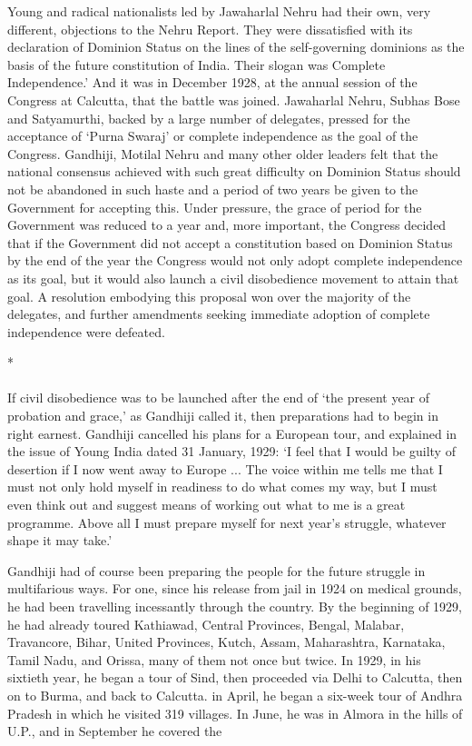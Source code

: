 \begin{multicols}{2}
Young and radical nationalists led by Jawaharlal Nehru had their own, very different, objections to the Nehru Report. They were dissatisfied with its declaration of Dominion Status on the lines of the self-governing dominions as the basis of the future constitution of India. Their slogan was Complete Independence.' And it was in December 1928, at the annual session of the Congress at Calcutta, that the battle was joined. Jawaharlal Nehru, Subhas Bose and Satyamurthi, backed by a large number of delegates, pressed for the acceptance of `Purna Swaraj' or complete independence as the goal of the Congress. Gandhiji, Motilal Nehru and many other older leaders felt that the national consensus achieved with such great difficulty on Dominion Status should not be abandoned in such haste and a period of two years be given to the Government for accepting this. Under pressure, the grace of period for the Government was reduced to a year and, more important, the Congress decided that if the Government did not accept a constitution based on Dominion Status by the end of the year the Congress would not only adopt complete independence as its goal, but it would also launch a civil disobedience movement to attain that goal. A resolution embodying this proposal won over the majority of the delegates, and further amendments seeking immediate adoption of complete independence were defeated.

\begin{center}*\end{center}

\paragraph*{}

If civil disobedience was to be launched after the end of `the present year of probation and grace,' as Gandhiji called it, then preparations had to begin in right earnest. Gandhiji cancelled his plans for a European tour, and explained in the issue of Young India dated 31 January, 1929: `I feel that I would be guilty of desertion if I now went away to Europe ... The voice within me tells me that I must not only hold myself in readiness to do what comes my way, but I must even think out and suggest means of working out what to me is a great programme. Above all I must prepare myself for next year's struggle, whatever shape it may take.' 

Gandhiji had of course been preparing the people for the future struggle in multifarious ways. For one, since his release from jail in 1924 on medical grounds, he had been travelling incessantly through the country. By the beginning of 1929, he had already toured Kathiawad, Central Provinces, Bengal, Malabar, Travancore, Bihar, United Provinces, Kutch, Assam, Maharashtra, Karnataka, Tamil Nadu, and Orissa, many of them not once but twice. In 1929, in his sixtieth year, he began a tour of Sind, then proceeded via Delhi to Calcutta, then on to Burma, and back to Calcutta. in April, he began a six-week tour of Andhra Pradesh in which he visited 319 villages. In June, he was in Almora in the hills of U.P., and in September he covered the 


\end{multicols}
